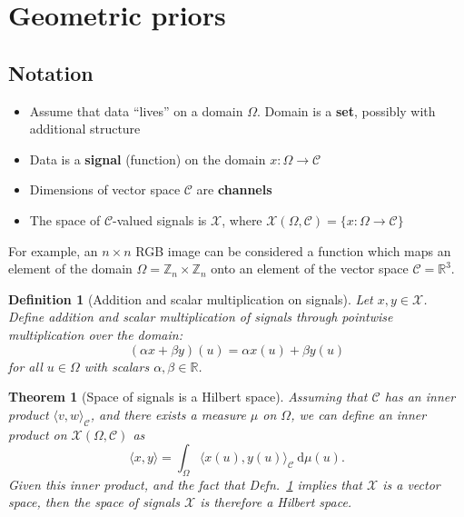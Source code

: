 \documentclass[11pt]{article}
\numberwithin{equation}{section}
\newtheorem{thm}{Theorem}[section]
\newtheorem{defn}{Definition}[section]
\begin{document}
\section{Geometric priors}

\subsection{Notation}
\begin{itemize}[noitemsep]
\item Assume that data ``lives'' on a domain $\Omega$. Domain is a \textbf{set}, possibly with additional structure
\item Data is a \textbf{signal} (function) on the domain $x : \Omega \rightarrow \mathcal{C}$
\item Dimensions of vector space $\mathcal{C}$ are \textbf{channels}
\item The space of $\mathcal{C}$-valued signals is $\mathcal{X}$, where $\mathcal{X}(\Omega, \mathcal{C}) = \{x: \Omega \rightarrow \mathcal{C} \}$
\end{itemize}

For example, an $n \times n$ RGB image can be considered a function which maps an element of the domain $\Omega = \mathbb{Z}_n \times \mathbb{Z}_n$ onto an element of the vector space $\mathcal{C}=\mathbb{R}^3$. 

\begin{defn}[Addition and scalar multiplication on signals] \label{defn:add-mul-signals}
Let $x,y \in \mathcal{X}$. Define addition and scalar multiplication of signals through pointwise multiplication over the domain: 
\begin{equation}
(\alpha x + \beta y)(u) = \alpha x(u) + \beta y(u)
\end{equation}
for all $u \in \Omega$ with scalars $\alpha, \beta \in \mathbb{R}$.
\end{defn}

\begin{thm}[Space of signals is a Hilbert space]
Assuming that $\mathcal{C}$ has an inner product $\langle v, w \rangle_\mathcal{C}$, and there exists a measure $\mu$ on $\Omega$, we can define an inner product on $\mathcal{X}(\Omega, \mathcal{C})$ as
\begin{equation}
\langle x, y \rangle = \int_\Omega \langle x(u), y(u) \rangle_\mathcal{C}\ \mathrm{d}\mu(u). \label{eq:inner-prod-signals}
\end{equation}
Given this inner product, and the fact that Defn.~\ref{defn:add-mul-signals} implies that $\mathcal{X}$ is a vector space, then the space of signals $\mathcal{X}$ is therefore a Hilbert space.
\end{thm}
\end{document}
